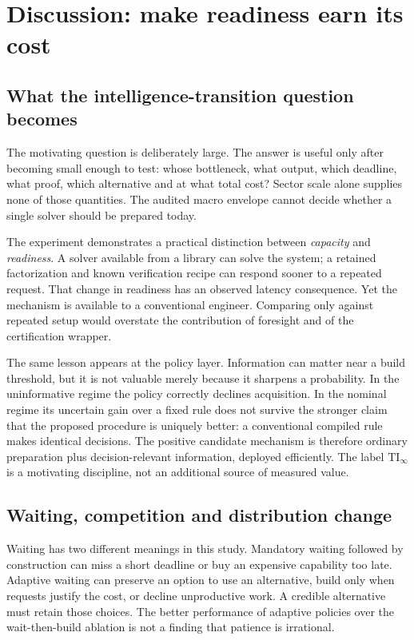\documentclass[11pt,a4paper]{article}
\newcommand{\TI}{\ensuremath{\mathrm{TI}_{\infty}}}
\begin{document}
\FloatBarrier
\section{Discussion: make readiness earn its cost}
\subsection{What the intelligence-transition question becomes}
The motivating question is deliberately large. The answer is useful only after becoming small enough to test: whose bottleneck, what output, which deadline, what proof, which alternative and at what total cost? Sector scale alone supplies none of those quantities. The audited macro envelope cannot decide whether a single solver should be prepared today.

The experiment demonstrates a practical distinction between \emph{capacity} and \emph{readiness}. A solver available from a library can solve the system; a retained factorization and known verification recipe can respond sooner to a repeated request. That change in readiness has an observed latency consequence. Yet the mechanism is available to a conventional engineer. Comparing only against repeated setup would overstate the contribution of foresight and of the certification wrapper.

The same lesson appears at the policy layer. Information can matter near a build threshold, but it is not valuable merely because it sharpens a probability. In the uninformative regime the policy correctly declines acquisition. In the nominal regime its uncertain gain over a fixed rule does not survive the stronger claim that the proposed procedure is uniquely better: a conventional compiled rule makes identical decisions. The positive candidate mechanism is therefore ordinary preparation plus decision-relevant information, deployed efficiently. The label \TI{} is a motivating discipline, not an additional source of measured value.

\subsection{Waiting, competition and distribution change}
Waiting has two different meanings in this study. Mandatory waiting followed by construction can miss a short deadline or buy an expensive capability too late. Adaptive waiting can preserve an option to use an alternative, build only when requests justify the cost, or decline unproductive work. A credible alternative must retain those choices. The better performance of adaptive policies over the wait-then-build ablation is not a finding that patience is irrational.
\end{document}
